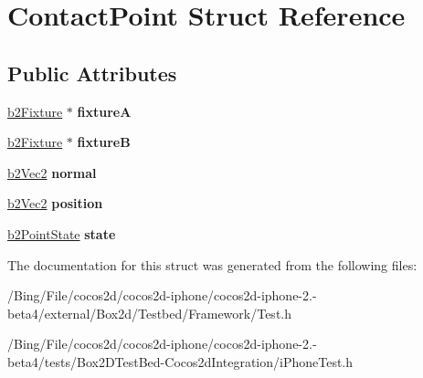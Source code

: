 \hypertarget{struct_contact_point}{\section{Contact\-Point Struct Reference}
\label{struct_contact_point}
}
\subsection*{Public Attributes}
\begin{DoxyCompactItemize}
\item 
\hypertarget{struct_contact_point_a5498f7ecae7710fd4202fc5ca3e1337d}{\hyperlink{classb2_fixture}{b2\-Fixture} $\ast$ {\bfseries fixture\-A}}\label{struct_contact_point_a5498f7ecae7710fd4202fc5ca3e1337d}

\item 
\hypertarget{struct_contact_point_a6d4f8358bbb7c52db7cd5d6cfeeb2a80}{\hyperlink{classb2_fixture}{b2\-Fixture} $\ast$ {\bfseries fixture\-B}}\label{struct_contact_point_a6d4f8358bbb7c52db7cd5d6cfeeb2a80}

\item 
\hypertarget{struct_contact_point_a41bc30994cbefb7c33ed08fc5196a56e}{\hyperlink{structb2_vec2}{b2\-Vec2} {\bfseries normal}}\label{struct_contact_point_a41bc30994cbefb7c33ed08fc5196a56e}

\item 
\hypertarget{struct_contact_point_a4fb05c387ebf7e3d0a44c7655b5dd6b5}{\hyperlink{structb2_vec2}{b2\-Vec2} {\bfseries position}}\label{struct_contact_point_a4fb05c387ebf7e3d0a44c7655b5dd6b5}

\item 
\hypertarget{struct_contact_point_a1b95214f8bd0f1e8ceb4a990dd1b8cc4}{\hyperlink{b2_collision_8h_a0a894e3715ce8c61b7958dd6e083663d}{b2\-Point\-State} {\bfseries state}}\label{struct_contact_point_a1b95214f8bd0f1e8ceb4a990dd1b8cc4}

\end{DoxyCompactItemize}


The documentation for this struct was generated from the following files\-:\begin{DoxyCompactItemize}
\item 
/\-Bing/\-File/cocos2d/cocos2d-\/iphone/cocos2d-\/iphone-\/2.-\/beta4/external/\-Box2d/\-Testbed/\-Framework/Test.\-h\item 
/\-Bing/\-File/cocos2d/cocos2d-\/iphone/cocos2d-\/iphone-\/2.-\/beta4/tests/\-Box2\-D\-Test\-Bed-\/\-Cocos2d\-Integration/i\-Phone\-Test.\-h\end{DoxyCompactItemize}
